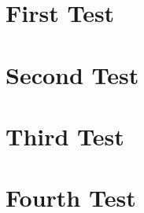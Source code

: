 \documentclass[12pt, twoside]{report}
\theoremstyle{definition}
\begin{document}


\tableofcontents{}

\chapter{First Test}



\chapter{Second Test}



\chapter{Third Test}



\chapter{Fourth Test}


\end{document}
